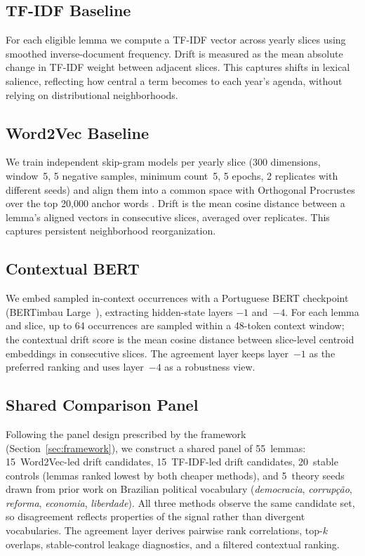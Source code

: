 \documentclass[12pt]{article}
\begin{document}
\FloatBarrier

\subsection{TF-IDF Baseline}

For each eligible lemma we compute a TF-IDF vector
across yearly slices using smoothed inverse-document frequency. Drift is
measured as the mean absolute change in TF-IDF weight between adjacent slices.
This captures shifts in lexical salience, reflecting how central a term becomes
to each year's agenda, without relying on distributional neighborhoods.

\subsection{Word2Vec Baseline}

We train independent skip-gram models per yearly
slice (300 dimensions, window~5, 5 negative samples, minimum count~5, 5 epochs,
2 replicates with different seeds) and align them into a common space with
Orthogonal Procrustes over the top 20{,}000 anchor words
\cite{hamilton-etal-2016-diachronic}. Drift is the mean cosine distance between
a lemma's aligned vectors in consecutive slices, averaged over replicates. This
captures persistent neighborhood reorganization.

\subsection{Contextual BERT}

We embed sampled in-context occurrences with a Portuguese
BERT checkpoint (BERTimbau Large~\cite{souza-etal-2020-bertimbau}),
extracting hidden-state layers $-1$ and~$-4$. For each lemma and slice, up to 64 occurrences are sampled within a
48-token context window; the contextual drift score is the mean cosine distance
between slice-level centroid embeddings in consecutive slices. The agreement
layer keeps layer~$-1$ as the preferred ranking and uses layer~$-4$ as a
robustness view.

\subsection{Shared Comparison Panel}

Following the panel design prescribed by the framework
(Section~\ref{sec:framework}), we construct a shared panel of 55~lemmas:
15~Word2Vec-led drift candidates, 15~TF-IDF-led drift candidates, 20~stable
controls (lemmas ranked lowest by both cheaper methods), and 5~theory seeds
drawn from prior work on Brazilian political vocabulary (\textit{democracia},
\textit{corrup\c{c}\~ao}, \textit{reforma}, \textit{economia},
\textit{liberdade}). All three methods observe the same candidate set, so
disagreement reflects properties of the signal rather than divergent
vocabularies. The agreement layer derives pairwise rank correlations, top-$k$
overlaps, stable-control leakage diagnostics, and a filtered contextual
ranking.
\end{document}
